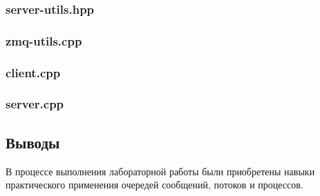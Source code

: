 \documentclass[12pt]{article}
\begin{document}
	
	
	\subsubsection*{server-utils.hpp}
	
	
	
	\subsubsection*{zmq-utils.cpp}
	
	
	
	\subsubsection*{client.cpp}
	
	
	
	\subsubsection*{server.cpp}
	
	
	
	\subsection*{Выводы}
	
	В процессе выполнения лабораторной работы были приобретены навыки практического применения очередей сообщений, потоков и процессов.
	
\end{document}
